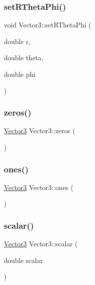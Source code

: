 \mbox{\label{class_vector3_a8f5b7f22c561c335017ad3a76bcd1808}} 
\subsubsection{\texorpdfstring{setRThetaPhi()}{setRThetaPhi()}}
{\footnotesize\ttfamily void Vector3\+::set\+R\+Theta\+Phi (\begin{DoxyParamCaption}\item[{double}]{r,  }\item[{double}]{theta,  }\item[{double}]{phi }\end{DoxyParamCaption})}

\mbox{\label{class_vector3_a2e44cab723edf5af6d32cb4ff1f6b55e}} 
\subsubsection{\texorpdfstring{zeros()}{zeros()}}
{\footnotesize\ttfamily \mbox{\hyperlink{class_vector3}{Vector3}} Vector3\+::zeros (\begin{DoxyParamCaption}{ }\end{DoxyParamCaption})\hspace{0.3cm}{\ttfamily [static]}}

\mbox{\label{class_vector3_aaf1dd90e7ff3988038434dc2416a342f}} 
\subsubsection{\texorpdfstring{ones()}{ones()}}
{\footnotesize\ttfamily \mbox{\hyperlink{class_vector3}{Vector3}} Vector3\+::ones (\begin{DoxyParamCaption}{ }\end{DoxyParamCaption})\hspace{0.3cm}{\ttfamily [static]}}

\mbox{\label{class_vector3_a9c6df044ff0f0b8e7809d3dbfa84407e}} 
\subsubsection{\texorpdfstring{scalar()}{scalar()}}
{\footnotesize\ttfamily \mbox{\hyperlink{class_vector3}{Vector3}} Vector3\+::scalar (\begin{DoxyParamCaption}\item[{double}]{scalar }\end{DoxyParamCaption})\hspace{0.3cm}{\ttfamily [static]}}

